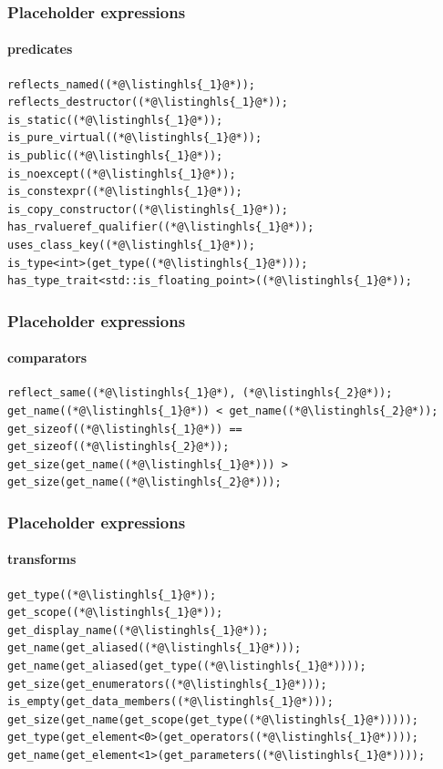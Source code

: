 \documentclass[aspectratio=169,compress,table,xcolor=table]{beamer}
\begin{document}
\begin{frame}[fragile]
  \frametitle{Placeholder expressions}
  \framesubtitle{predicates}
  \begin{lstlisting}[language=c++2x,basicstyle=\normalsize\ttfamily]
reflects_named((*@\listinghls{_1}@*));
reflects_destructor((*@\listinghls{_1}@*));
is_static((*@\listinghls{_1}@*));
is_pure_virtual((*@\listinghls{_1}@*));
is_public((*@\listinghls{_1}@*));
is_noexcept((*@\listinghls{_1}@*));
is_constexpr((*@\listinghls{_1}@*));
is_copy_constructor((*@\listinghls{_1}@*));
has_rvalueref_qualifier((*@\listinghls{_1}@*));
uses_class_key((*@\listinghls{_1}@*));
is_type<int>(get_type((*@\listinghls{_1}@*)));
has_type_trait<std::is_floating_point>((*@\listinghls{_1}@*));
  \end{lstlisting}
\end{frame}
\begin{frame}[fragile]
  \frametitle{Placeholder expressions}
  \framesubtitle{comparators}
  \begin{lstlisting}[language=c++2x,basicstyle=\normalsize\ttfamily]
reflect_same((*@\listinghls{_1}@*), (*@\listinghls{_2}@*));
get_name((*@\listinghls{_1}@*)) < get_name((*@\listinghls{_2}@*));
get_sizeof((*@\listinghls{_1}@*)) == get_sizeof((*@\listinghls{_2}@*));
get_size(get_name((*@\listinghls{_1}@*))) > get_size(get_name((*@\listinghls{_2}@*)));
  \end{lstlisting}
\end{frame}
\begin{frame}[fragile]
  \frametitle{Placeholder expressions}
  \framesubtitle{transforms}
  \begin{lstlisting}[language=c++2x,basicstyle=\normalsize\ttfamily]
get_type((*@\listinghls{_1}@*));
get_scope((*@\listinghls{_1}@*));
get_display_name((*@\listinghls{_1}@*));
get_name(get_aliased((*@\listinghls{_1}@*)));
get_name(get_aliased(get_type((*@\listinghls{_1}@*))));
get_size(get_enumerators((*@\listinghls{_1}@*)));
is_empty(get_data_members((*@\listinghls{_1}@*)));
get_size(get_name(get_scope(get_type((*@\listinghls{_1}@*)))));
get_type(get_element<0>(get_operators((*@\listinghls{_1}@*))));
get_name(get_element<1>(get_parameters((*@\listinghls{_1}@*))));
  \end{lstlisting}
\end{frame}
\end{document}

